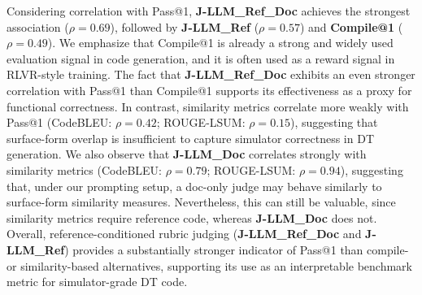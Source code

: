 Considering correlation with Pass@1, \textbf{J-LLM\_Ref\_Doc} achieves the strongest association ($\rho=0.69$), followed by \textbf{J-LLM\_Ref} ($\rho=0.57$) and \textbf{Compile@1} ($\rho=0.49$).
We emphasize that Compile@1 is already a strong and widely used evaluation signal in code generation, and it is often used as a reward signal in RLVR-style training.
The fact that \textbf{J-LLM\_Ref\_Doc} exhibits an even stronger correlation with Pass@1 than Compile@1 supports its effectiveness as a proxy for functional correctness.
In contrast, similarity metrics correlate more weakly with Pass@1 (CodeBLEU: $\rho=0.42$; ROUGE-LSUM: $\rho=0.15$), suggesting that surface-form overlap is insufficient to capture simulator correctness in DT generation.
We also observe that \textbf{J-LLM\_Doc} correlates strongly with similarity metrics (CodeBLEU: $\rho=0.79$; ROUGE-LSUM: $\rho=0.94$), suggesting that, under our prompting setup, a doc-only judge may behave similarly to surface-form similarity measures. Nevertheless, this can still be valuable, since similarity metrics require reference code, whereas \textbf{J-LLM\_Doc} does not.
Overall, reference-conditioned rubric judging (\textbf{J-LLM\_Ref\_Doc} and \textbf{J-LLM\_Ref}) provides a substantially stronger indicator of Pass@1 than compile- or similarity-based alternatives, supporting its use as an interpretable benchmark metric for simulator-grade DT code.



